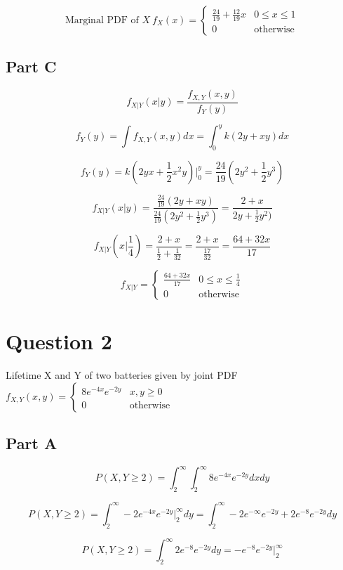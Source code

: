 \documentclass[letterpaper]{article}
\begin{document}
$$\text{Marginal PDF of } X \ f_X(x) = \begin{cases} \frac{24}{19} + \frac{12}{19} x & 0 \leq x \leq 1 \\ 0 & \text{otherwise} \end{cases}$$

\subsection*{Part C}

$$f_{X|Y} (x|y) = \frac{f_{X,Y}(x,y)}{f_Y(y)}$$

$$f_Y(y) = \int f_{X, Y}(x, y) dx = \int_0^y k(2y + xy) dx$$

$$f_Y(y) = k(2yx + \frac{1}{2} x^2y) \Big|_0^y = \frac{24}{19} (2y^2 + \frac{1}{2} y^3)$$

$$f_{X|Y} (x|y) = \frac{\frac{24}{19}(2y + xy)}{\frac{24}{19} (2y^2 + \frac{1}{2} y^3)} = \frac{2 + x}{2y + \frac{1}{2} y^2)}$$

$$f_{X|Y} (x|\frac{1}{4}) = \frac{2 + x}{\frac{1}{2} + \frac{1}{32}} = \frac{2 + x}{\frac{17}{32}} = \frac{64 + 32x}{17}$$

$$f_{X|Y} = \begin{cases} \frac{64 + 32x}{17} & 0 \leq x \leq \frac{1}{4} \\ 0 & \text{otherwise} \end{cases}$$

\newpage

\section*{Question 2}

Lifetime X and Y of two batteries given by joint PDF $f_{X,Y}(x, y) = \begin{cases} 8e^{-4x}e^{-2y} & x, y \geq 0 \\ 0 & \text{otherwise} \end{cases}$

\subsection*{Part A}

$$P(X, Y \geq 2) = \int_2^{\infty} \int_2^{\infty} 8e^{-4x}e^{-2y} dx dy$$

$$P(X, Y \geq 2) = \int_2^{\infty} -2e^{-4x}e^{-2y} \Big|_2^{\infty} dy = \int_2^{\infty} -2e^{-\infty}e^{-2y} + 2e^{-8}e^{-2y} dy$$

$$P(X, Y \geq 2) = \int_2^{\infty} 2e^{-8}e^{-2y} dy = -e^{-8}e^{-2y} \Big|_2^{\infty}$$
\end{document}
